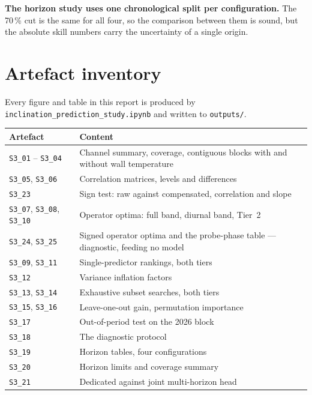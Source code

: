 \documentclass[11pt,a4paper]{article}
\begin{document}
\textbf{The horizon study uses one chronological split per configuration.} The
70\,\% cut is the same for all four, so the comparison between them is sound, but
the absolute skill numbers carry the uncertainty of a single origin.

\section{Artefact inventory}

Every figure and table in this report is produced by
\texttt{inclination\_prediction\_study.ipynb} and written to \texttt{outputs/}.

\begin{center}
\small
\begin{tabularx}{\textwidth}{L{4.6cm}Y}
\toprule
\textbf{Artefact} & \textbf{Content} \\
\midrule
\texttt{S3\_01} -- \texttt{S3\_04} & Channel summary, coverage, contiguous
blocks with and without wall temperature \\
\texttt{S3\_05}, \texttt{S3\_06} & Correlation matrices, levels and differences \\
\texttt{S3\_23} & Sign test: raw against compensated, correlation and slope \\
\texttt{S3\_07}, \texttt{S3\_08}, \texttt{S3\_10} & Operator optima: full band,
diurnal band, Tier~2 \\
\texttt{S3\_24}, \texttt{S3\_25} & Signed operator optima and the probe-phase
table --- diagnostic, feeding no model \\
\texttt{S3\_09}, \texttt{S3\_11} & Single-predictor rankings, both tiers \\
\texttt{S3\_12} & Variance inflation factors \\
\texttt{S3\_13}, \texttt{S3\_14} & Exhaustive subset searches, both tiers \\
\texttt{S3\_15}, \texttt{S3\_16} & Leave-one-out gain, permutation importance \\
\texttt{S3\_17} & Out-of-period test on the 2026 block \\
\texttt{S3\_18} & The diagnostic protocol \\
\texttt{S3\_19} & Horizon tables, four configurations \\
\texttt{S3\_20} & Horizon limits and coverage summary \\
\texttt{S3\_21} & Dedicated against joint multi-horizon head \\

\end{tabularx}
\end{center}
\end{document}
